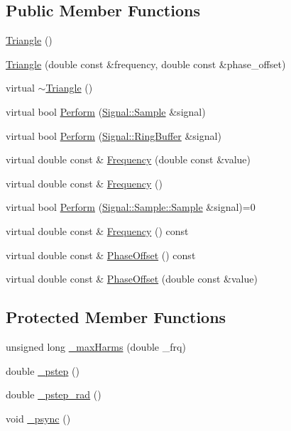 \subsection*{Public Member Functions}
\begin{DoxyCompactItemize}
\item 
\hyperlink{classDSG_1_1Fourier_1_1Triangle_ad9854b85c81048a7a9685b82efb2730d}{Triangle} ()
\item 
\hyperlink{classDSG_1_1Fourier_1_1Triangle_a11b507ce203fc40e3928b9fb0e415c6e}{Triangle} (double const \&frequency, double const \&phase\-\_\-offset)
\item 
virtual \hyperlink{classDSG_1_1Fourier_1_1Triangle_a3dc2d4b7ca07c0e730671cf5832f6cc4}{$\sim$\-Triangle} ()
\item 
virtual bool \hyperlink{classDSG_1_1Fourier_1_1Triangle_adbc9f5f2a7193a3920c66af2988cd905}{Perform} (\hyperlink{classDSG_1_1Signal_1_1Sample}{Signal\-::\-Sample} \&signal)
\item 
virtual bool \hyperlink{classDSG_1_1Fourier_1_1Triangle_a50d9d6ed5ce686740af59a7f85c40f4a}{Perform} (\hyperlink{classDSG_1_1Signal_1_1RingBuffer}{Signal\-::\-Ring\-Buffer} \&signal)
\item 
virtual double const \& \hyperlink{classDSG_1_1Fourier_1_1Triangle_a239adb0a4604a495bb3935b8a52e2c4b}{Frequency} (double const \&value)
\item 
virtual double const \& \hyperlink{classDSG_1_1Fourier_1_1Triangle_a03829961eba7c7ce8f052121a4bcf69d}{Frequency} ()
\item 
virtual bool \hyperlink{classDSG_1_1SignalProcess_ae8a803d175eca1ec5f34a52035a082b4}{Perform} (\hyperlink{classDSG_1_1Signal_1_1Sample_a21db6fade3ee3554ed3887cb2b74daff}{Signal\-::\-Sample\-::\-Sample} \&signal)=0
\item 
virtual double const \& \hyperlink{classDSG_1_1SignalGenerator_aedac746c5a70818d120858542ecb7c45}{Frequency} () const 
\item 
virtual double const \& \hyperlink{classDSG_1_1SignalGenerator_a1ce521847edd0b837fd840998f906b4b}{Phase\-Offset} () const 
\item 
virtual double const \& \hyperlink{classDSG_1_1SignalGenerator_a08b71b1f30ba65e629642c570291dc0e}{Phase\-Offset} (double const \&value)
\end{DoxyCompactItemize}
\subsection*{Protected Member Functions}
\begin{DoxyCompactItemize}
\item 
unsigned long \hyperlink{classDSG_1_1Fourier_1_1FourierGenerator_a38d0cc3f7f26e89379626627c17ae33a}{\-\_\-max\-Harms} (double \-\_\-frq)
\item 
double \hyperlink{classDSG_1_1SignalGenerator_ac0d781b8673b3a283bf7c133290ede50}{\-\_\-pstep} ()
\item 
double \hyperlink{classDSG_1_1SignalGenerator_ae660eb4caa88b8d278f8d24d0908a487}{\-\_\-pstep\-\_\-rad} ()
\item 
void \hyperlink{classDSG_1_1SignalGenerator_a05baccb38d1e52860d4fcf7cb8430efc}{\-\_\-psync} ()
\end{DoxyCompactItemize}
